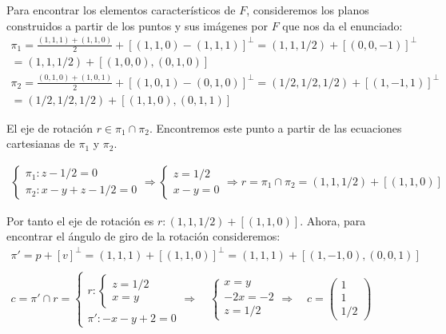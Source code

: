 Para encontrar los elementos característicos de $F$, consideremos los planos construidos a partir de los puntos y sus imágenes por $F$ que nos da el enunciado:
\begin{gather*}
    \pi_1= \frac{(1,1,1)+(1,1,0)}{2} + [(1,1,0) - (1,1,1)]^{\perp} = (1,1,1/2) + [(0,0,-1)]^{\perp}\\ = (1,1,1/2) + [(1,0,0),(0,1,0)]\\
    \pi_2 = \frac{(0,1,0)+(1,0,1)}{2} + [(1,0,1) - (0,1,0)]^{\perp} = (1/2,1/2,1/2) + [(1,-1,1)]^{\perp}\\ = (1/2,1/2,1/2) + [(1,1,0),(0,1,1)]
\end{gather*}

El eje de rotación $r \in \pi_1 \cap \pi_2$. Encontremos este punto a partir de las ecuaciones cartesianas de $\pi_1$ y $\pi_2$.

\begin{gather*}
    \begin{cases}
    \pi_1 : z - 1/2 = 0  \\
    \pi_2 : x -y + z -1/2 = 0
    \end{cases}
    \Longrightarrow
    \begin{cases}
    z = 1/2\\ x - y = 0
    \end{cases}
    \Longrightarrow
    r = \pi_1 \cap \pi_2 = (1,1,1/2) + [(1,1,0)]
\end{gather*}

Por tanto el eje de rotación es $r: (1,1,1/2) + [(1,1,0)]$. Ahora, para encontrar el ángulo de giro de la rotación consideremos:
\begin{gather*}
    \pi' = p + [v]^{\perp} = (1,1,1) +[(1,1,0)]^{\perp} = (1,1,1) + [(1,-1,0), (0,0,1)]\\ \\
    c = \pi' \cap r = 
    \begin{cases}
    r: \begin{cases} z= 1/2\\ x = y \end{cases}\\
    \pi': -x-y+2=0
    \end{cases}
    \Longrightarrow \quad
    \begin{cases}
    x = y\\ -2x = -2\\ z = 1/2
    \end{cases}
    \Longrightarrow \quad
    c = \begin{pmatrix} 1 \\ 1 \\ 1/2 \end{pmatrix}
\end{gather*}

